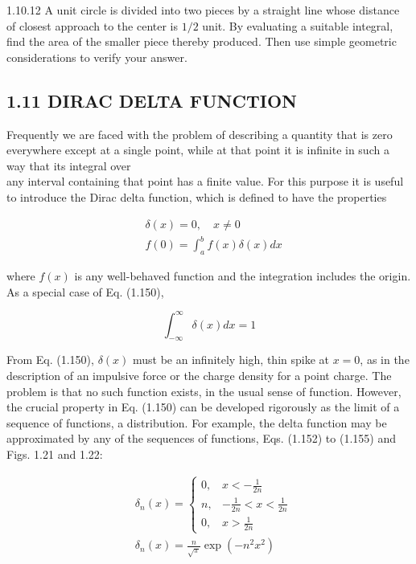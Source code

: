 \documentclass[10pt]{article}
\begin{document}
1.10.12 A unit circle is divided into two pieces by a straight line whose distance of closest approach to the center is $1 / 2$ unit. By evaluating a suitable integral, find the area of the smaller piece thereby produced. Then use simple geometric considerations to verify your answer.

\subsection*{1.11 DIRAC DELTA FUNCTION}
Frequently we are faced with the problem of describing a quantity that is zero everywhere except at a single point, while at that point it is infinite in such a way that its integral over\\
any interval containing that point has a finite value. For this purpose it is useful to introduce the Dirac delta function, which is defined to have the properties


\begin{align*}
& \delta(x)=0, \quad x \neq 0  \tag{1.149}\\
& f(0)=\int_{a}^{b} f(x) \delta(x) d x \tag{1.150}
\end{align*}


where $f(x)$ is any well-behaved function and the integration includes the origin. As a special case of Eq. (1.150),


\begin{equation*}
\int_{-\infty}^{\infty} \delta(x) d x=1 \tag{1.151}
\end{equation*}


From Eq. (1.150), $\delta(x)$ must be an infinitely high, thin spike at $x=0$, as in the description of an impulsive force or the charge density for a point charge. The problem is that no such function exists, in the usual sense of function. However, the crucial property in Eq. (1.150) can be developed rigorously as the limit of a sequence of functions, a distribution. For example, the delta function may be approximated by any of the sequences of functions, Eqs. (1.152) to (1.155) and Figs. 1.21 and 1.22:


\begin{align*}
& \delta_{n}(x)= \begin{cases}0, & x<-\frac{1}{2 n} \\
n, & -\frac{1}{2 n}<x<\frac{1}{2 n} \\
0, & x>\frac{1}{2 n}\end{cases}  \tag{1.152}\\
& \delta_{n}(x)=\frac{n}{\sqrt{\pi}} \exp \left(-n^{2} x^{2}\right) \tag{1.153}
\end{align*}
\end{document}
